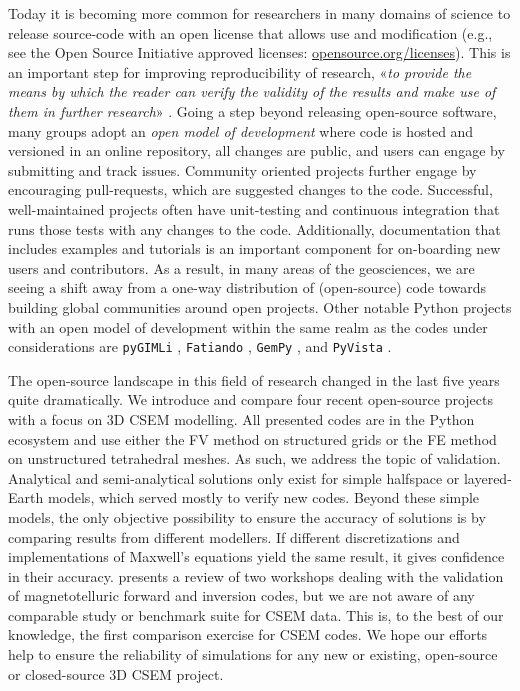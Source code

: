 \documentclass[
    paper,
  ]{geophysics}
\begin{document}
Today it is becoming more common for researchers in many domains of science to release source-code with an open license that allows use and modification (e.g., see the Open Source Initiative approved licenses: \href{https://opensource.org/licenses}{opensource.org/licenses}). This is an important step for improving reproducibility of research, «\emph{to provide the means by which the reader can verify the validity of the results and make use of them in further research}» \citep{GEO.17.Broggini}. Going a step beyond releasing open-source software, many groups adopt an \emph{open model of development} where code is hosted and versioned in an online repository, all changes are public, and users can engage by submitting and track issues. Community oriented projects further engage by encouraging pull-requests, which are suggested changes to the code. Successful, well-maintained projects often have unit-testing and continuous integration that runs those tests with any changes to the code. Additionally, documentation that includes examples and tutorials is an important component for on-boarding new users and contributors. As a result, in many areas of the geosciences, we are seeing a shift away from a one-way distribution of (open-source) code towards building global communities around open projects. Other notable Python projects with an open model of development within the same realm as the codes under considerations are \texttt{pyGIMLi} \citep{CAG.17.Rucker}, \texttt{Fatiando} \citep{JOSS.18.Uieda}, \texttt{GemPy} \citep{GMD.19.DeLaVarga}, and \texttt{PyVista} \citep{JOSS.19.Sullivan}.

The open-source landscape in this field of research changed in the last five years quite dramatically. We introduce and compare four recent open-source projects with a focus on 3D CSEM modelling. All presented codes are in the Python ecosystem and use either the FV method on structured grids or the FE method on unstructured tetrahedral meshes. As such, we address the topic of validation. Analytical and semi-analytical solutions only exist for simple halfspace or layered-Earth models, which served mostly to verify new codes. Beyond these simple models, the only objective possibility to ensure the accuracy of solutions is by comparing results from different modellers. If different discretizations and implementations of Maxwell's equations yield the same result, it gives confidence in their accuracy. \cite{GJI.13.Miensopust} presents a review of two workshops dealing with the validation of magnetotelluric forward and inversion codes, but we are not aware of any comparable study or benchmark suite for CSEM data. This is, to the best of our knowledge, the first comparison exercise for CSEM codes. We hope our efforts help to ensure the reliability of simulations for any new or existing, open-source or closed-source 3D CSEM project.
\end{document}
